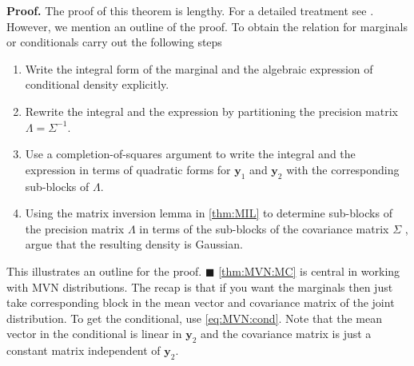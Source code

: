 \documentclass[10pt]{article}
\theoremstyle{definition}
\newenvironment{prf}{\noindent\textbf{Proof.}}{\hfill$\blacksquare$}
\begin{document}
\begin{prf}
The proof of this theorem is lengthy. For a detailed treatment see \cite{Do2009}. However, we mention an outline of the proof. To obtain the relation for marginals or conditionals carry out the following steps
\begin{enumerate}[noitemsep]
\item Write the integral form of the marginal and the algebraic expression of conditional density explicitly.
\item Rewrite the integral and the expression by partitioning the precision matrix $\mathsf{\Lambda}=\mathsf{\Sigma}^{-1}$.
\item Use a completion-of-squares argument to write the integral and the expression in terms of quadratic forms for $\mathbf{y}_1$ and $\mathbf{y}_2$ with the corresponding sub-blocks of $\mathsf{\Lambda}$.
\item Using the matrix inversion lemma in \cref{thm:MIL} to determine sub-blocks of the precision matrix $\mathsf{\Lambda}$ in terms of the sub-blocks of the covariance matrix $\mathsf{\Sigma}$ , argue that the resulting density is Gaussian.
\end{enumerate}
This illustrates an outline for the proof.
\end{prf}
\newline
\cref{thm:MVN:MC} is central in working with MVN distributions. The recap is that if you want the marginals then just take corresponding block in the mean vector and covariance matrix of the joint distribution. To get the conditional, use \cref{eq:MVN:cond}. Note that the mean vector in the conditional is linear in $\mathbf{y}_2$ and the covariance matrix is just a constant matrix independent of $\mathbf{y}_2$.
\end{document}
